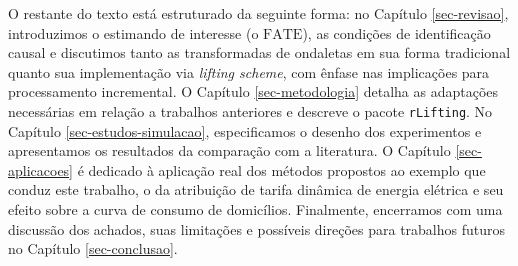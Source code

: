 O restante do texto está estruturado da seguinte forma: no Capítulo \ref{sec-revisao}, introduzimos o estimando de interesse (o \(\mathrm{FATE}\)), as condições de identificação causal e discutimos tanto as transformadas de ondaletas em sua forma tradicional quanto sua implementação via \emph{lifting scheme}, com ênfase nas implicações para processamento incremental. 
O Capítulo \ref{sec-metodologia} detalha as adaptações necessárias em relação a trabalhos anteriores e descreve o pacote \texttt{rLifting}. 
No Capítulo \ref{sec-estudos-simulacao}, especificamos o desenho dos experimentos e apresentamos os resultados da comparação com a literatura. 
O Capítulo \ref{sec-aplicacoes} é dedicado à aplicação real dos métodos propostos ao exemplo que conduz este trabalho, o da atribuição de tarifa dinâmica de energia elétrica e seu efeito sobre a curva de consumo de domicílios.
Finalmente, encerramos com uma discussão dos achados, suas limitações e possíveis direções para trabalhos futuros no Capítulo \ref{sec-conclusao}.
